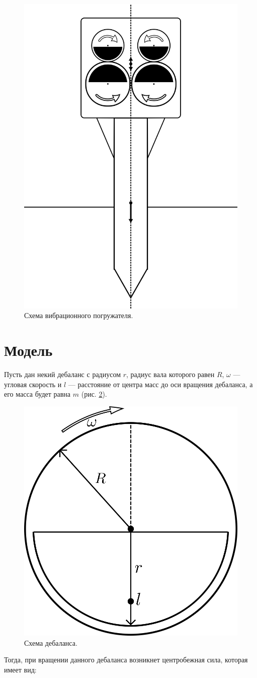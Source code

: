 \begin{figure}[h]
    \centering
    \includegraphics[width=0.5\linewidth]{img/scheme_porg.png}
    \caption{Схема вибрационного погружателя.}
    \label{fig:scheme_porg}
\end{figure}


\clearpage
\section{Модель}

Пусть дан некий дебаланс с радиусом $r$, радиус вала которого равен $R$, $\omega$ --- угловая скорость и $l$ --- расстояние от центра масс до оси вращения дебаланса, а его масса будет равна $m$ (рис. \ref{fig:debalance}). 

\begin{figure}[h]
    \centering
    \includegraphics[width=0.4\linewidth]{img/debalance.png}
    \caption{Схема дебаланса.}
    \label{fig:debalance}
\end{figure}

Тогда, при вращении данного дебаланса возникнет центробежная сила, которая имеет вид:

